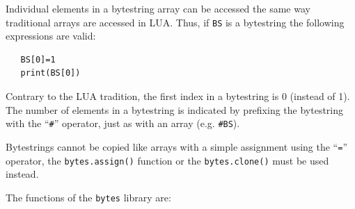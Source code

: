 \documentclass[11pt]{report}
\begin{document}
Individual elements in a bytestring array can be accessed the same 
way traditional arrays are accessed in LUA. Thus, if \texttt{BS} is
a bytestring the following expressions are valid:

\begin{verbatim}
   BS[0]=1
   print(BS[0])
\end{verbatim} 

Contrary to the LUA tradition, the first index in a bytestring is 0
(instead of 1). The number of elements in a bytestring is indicated 
by prefixing the bytestring with the ``\texttt{\#}'' operator, just as 
with an array (e.g. \texttt{\#BS}).

Bytestrings cannot be copied like arrays with a simple assignment 
using the ``\texttt{=}'' operator, the \texttt{bytes.assign()} function
or the \texttt{bytes.clone()} must be used instead.  

The functions of the \texttt{bytes} library are:
\end{document}

